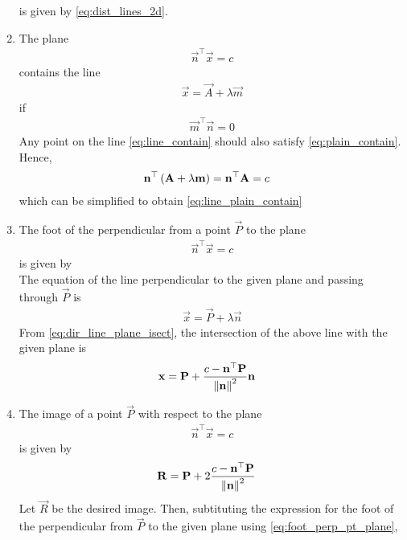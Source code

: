 \documentclass[journal,12pt,twocolumn]{IEEEtran}
\renewcommand\thesection{\arabic{section}}
\renewcommand\thesubsection{\thesection.\arabic{subsection}}
\begin{document}
\begin{enumerate}[label=\thesubsection.\arabic*.,ref=\thesubsection.\theenumi]
	is given by 
	\eqref{eq:dist_lines_2d}.
\item The plane 
		\begin{align}
		\vec{n}^{\top}
			\vec{x} = c
			\label{eq:plain_contain}
		\end{align}
		contains the line 
		\begin{align}
			\vec{x} = \vec{A}+\lambda \vec{m}
			\label{eq:line_contain}
		\end{align}
		if 
		\begin{align}
		\vec{m}^{\top}\vec{n} = 0
			\label{eq:line_plain_contain}
		\end{align}
		\solution Any point on the line 
			\eqref{eq:line_contain}
			should also satisfy 
			\eqref{eq:plain_contain}.  Hence, 
		\begin{align}
			\mathbf{n}^{\top}\left(\mathbf{A}+\lambda \mathbf{m}\right) &= \mathbf{n}^{\top}\mathbf{A}=c
		\end{align}
		which can be simplified to obtain
			\eqref{eq:line_plain_contain}
		\item The foot of the perpendicular from a point $\vec{P}$ to the plane 
		\begin{align}
			\vec{n}^{\top}\vec{x} =c
		\end{align}
		is given by 
		\\
		\solution The equation of the line perpendicular to the given plane and passing through $\vec{P}$ is 
		\begin{align}
			\vec{x} = \vec{P} + \lambda 	\vec{n}
		\end{align}
		From 
	\eqref{eq:dir_line_plane_isect}, the intersection of the above line with the given plane is 
\begin{align}
	\mathbf{x} &= \mathbf{P} + \frac{c - \mathbf{n}^{\top}\mathbf{P}}{\left\lVert\mathbf{n}\right\rVert^2}
\mathbf{n}
	\label{eq:foot_perp_pt_plane}
\end{align}
\item The image of a point $\vec{P}$ with respect to the plane 
		\begin{align}
			\vec{n}^{\top}\vec{x} =c
		\end{align}
		is given by 
		\begin{align}
			\mathbf{R} &=
	  \mathbf{P} + 2\frac{c - \mathbf{n}^{\top}\mathbf{P}}{\left\lVert\mathbf{n}\right\rVert^2}
			\label{eq:image_pt_plane}
		\end{align}
		\solution Let $\vec{R}$ be the desired image.  Then, subtituting the expression for the  foot of the perpendicular from $\vec{P}$ to the given plane using 
	\eqref{eq:foot_perp_pt_plane},
		\begin{align}

\end{align}
\end{enumerate}
\end{document}
